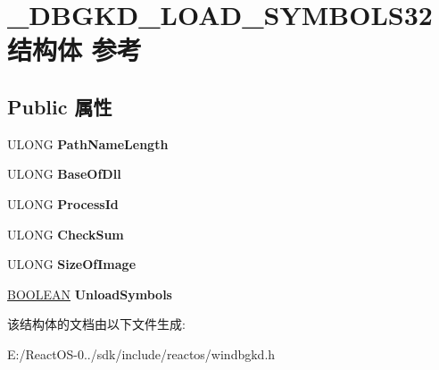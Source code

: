 \hypertarget{struct___d_b_g_k_d___l_o_a_d___s_y_m_b_o_l_s32}{}\section{\+\_\+\+D\+B\+G\+K\+D\+\_\+\+L\+O\+A\+D\+\_\+\+S\+Y\+M\+B\+O\+L\+S32结构体 参考}
\label{struct___d_b_g_k_d___l_o_a_d___s_y_m_b_o_l_s32}
\subsection*{Public 属性}
\begin{DoxyCompactItemize}
\item 
\mbox{\label{struct___d_b_g_k_d___l_o_a_d___s_y_m_b_o_l_s32_ae77deabd07ae3f98597191055ee323be}} 
U\+L\+O\+NG {\bfseries Path\+Name\+Length}
\item 
\mbox{\label{struct___d_b_g_k_d___l_o_a_d___s_y_m_b_o_l_s32_a41962723221499c83cee9c45cfd5b6d2}} 
U\+L\+O\+NG {\bfseries Base\+Of\+Dll}
\item 
\mbox{\label{struct___d_b_g_k_d___l_o_a_d___s_y_m_b_o_l_s32_a32184e8c7b2739d57628e01519ace1f0}} 
U\+L\+O\+NG {\bfseries Process\+Id}
\item 
\mbox{\label{struct___d_b_g_k_d___l_o_a_d___s_y_m_b_o_l_s32_a7fb34aad8a7da04e358504ce0d4f645a}} 
U\+L\+O\+NG {\bfseries Check\+Sum}
\item 
\mbox{\label{struct___d_b_g_k_d___l_o_a_d___s_y_m_b_o_l_s32_a9494fc4891091ff600fc96c367d91734}} 
U\+L\+O\+NG {\bfseries Size\+Of\+Image}
\item 
\mbox{\label{struct___d_b_g_k_d___l_o_a_d___s_y_m_b_o_l_s32_a4c722bc93439056d652d7170fb0616e5}} 
\hyperlink{_processor_bind_8h_a112e3146cb38b6ee95e64d85842e380a}{B\+O\+O\+L\+E\+AN} {\bfseries Unload\+Symbols}
\end{DoxyCompactItemize}


该结构体的文档由以下文件生成\+:\begin{DoxyCompactItemize}
\item 
E\+:/\+React\+O\+S-\/0../sdk/include/reactos/windbgkd.\+h\end{DoxyCompactItemize}
